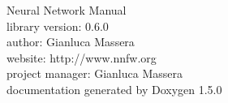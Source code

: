 \documentclass[a4paper]{book}
\begin{document}
\begin{titlepage}
\vspace*{7cm}
\begin{center}
{\Huge Neural Network Manual}\\
\vspace*{1cm}
{\large library version: 0.6.0}\\
{\large author: Gianluca Massera}\\
{\large website: http://www.nnfw.org}\\
{\large project manager: Gianluca Massera}\\
{\large documentation generated by Doxygen 1.5.0}\\
\end{center}
\end{titlepage}
\clearemptydoublepage


\tableofcontents
\clearemptydoublepage










\printindex
\end{document}
